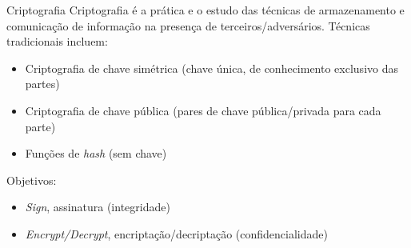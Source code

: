 \documentclass[utf8]{beamer}
\begin{document}
\begin{frame}{Criptografia}
  Criptografia é a prática e o estudo
  das técnicas de armazenamento e comunicação de informação
  na presença de terceiros/adversários.
  \vfill
  Técnicas tradicionais incluem:
  \begin{itemize}
    \item Criptografia de chave simétrica
          (chave única, de conhecimento exclusivo das partes)
    \item Criptografia de chave pública
          (pares de chave pública/privada para cada parte)
    \item Funções de \emph{hash} (sem chave)
  \end{itemize}
  \vfill
  Objetivos:
  \begin{itemize}
    \item \emph{Sign}, assinatura (integridade)
    \item \emph{Encrypt/Decrypt}, encriptação/decriptação
          (confidencialidade)
  \end{itemize}
\end{frame}
\end{document}
